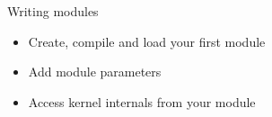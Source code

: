 \setuplabframe
{Writing modules}
{
  \begin{itemize}
  \item Create, compile and load your first module
  \item Add module parameters
  \item Access kernel internals from your module
  \end{itemize}
}

